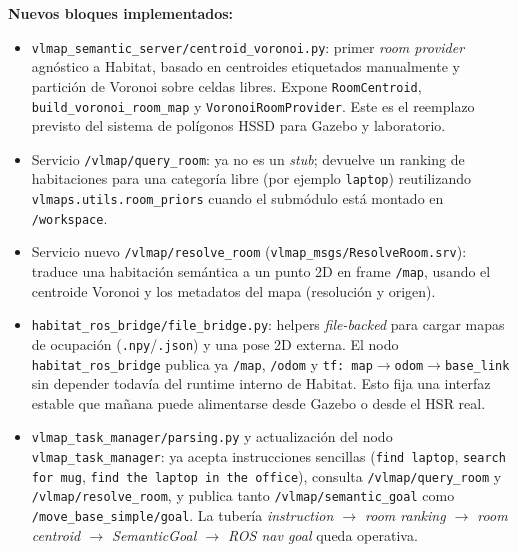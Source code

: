 \documentclass[11pt,a4paper]{article}
\begin{document}
\textbf{Nuevos bloques implementados:}
\begin{itemize}
  \item \texttt{vlmap\_semantic\_server/centroid\_voronoi.py}: primer
        \emph{room provider} agnóstico a Habitat, basado en centroides
        etiquetados manualmente y partición de Voronoi sobre celdas libres.
        Expone \texttt{RoomCentroid}, \texttt{build\_voronoi\_room\_map} y
        \texttt{VoronoiRoomProvider}. Este es el reemplazo previsto del
        sistema de polígonos HSSD para Gazebo y laboratorio.
  \item Servicio \texttt{/vlmap/query\_room}: ya no es un \emph{stub}; devuelve
        un ranking de habitaciones para una categoría libre (por ejemplo
        \texttt{laptop}) reutilizando \texttt{vlmaps.utils.room\_priors}
        cuando el submódulo está montado en \texttt{/workspace}.
  \item Servicio nuevo \texttt{/vlmap/resolve\_room}
        (\texttt{vlmap\_msgs/ResolveRoom.srv}): traduce una habitación
        semántica a un punto 2D en frame \texttt{/map}, usando el centroide
        Voronoi y los metadatos del mapa (resolución y origen).
  \item \texttt{habitat\_ros\_bridge/file\_bridge.py}: helpers \emph{file-backed}
        para cargar mapas de ocupación (\texttt{.npy}/\texttt{.json}) y una
        pose 2D externa. El nodo \texttt{habitat\_ros\_bridge} publica ya
        \texttt{/map}, \texttt{/odom} y \texttt{tf: map$\rightarrow$odom$\rightarrow$base\_link}
        sin depender todavía del runtime interno de Habitat. Esto fija una
        interfaz estable que mañana puede alimentarse desde Gazebo o desde el
        HSR real.
  \item \texttt{vlmap\_task\_manager/parsing.py} y actualización del nodo
        \texttt{vlmap\_task\_manager}: ya acepta instrucciones sencillas
        (\texttt{find laptop}, \texttt{search for mug},
        \texttt{find the laptop in the office}), consulta
        \texttt{/vlmap/query\_room} y \texttt{/vlmap/resolve\_room}, y publica
        tanto \texttt{/vlmap/semantic\_goal} como
        \texttt{/move\_base\_simple/goal}. La tubería
        \emph{instruction $\rightarrow$ room ranking $\rightarrow$ room centroid
        $\rightarrow$ SemanticGoal $\rightarrow$ ROS nav goal} queda operativa.
\end{itemize}
\end{document}
